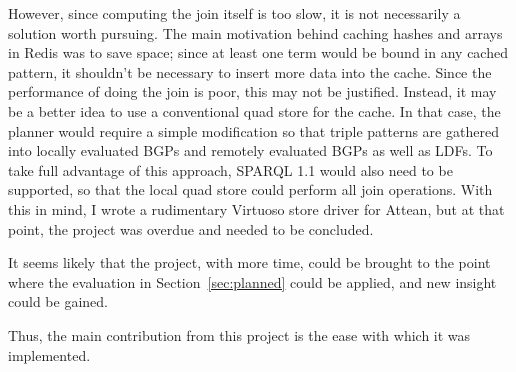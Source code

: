 However, since computing the join itself is too slow, it is not
necessarily a solution worth pursuing. The main motivation behind
caching hashes and arrays in Redis was to save space; since at least
one term would be bound in any cached pattern, it shouldn't be
necessary to insert more data into the cache. Since the performance of
doing the join is poor, this may not be justified. Instead, it may be
a better idea to use a conventional quad store for the cache. In that
case, the planner would require a simple modification so that triple
patterns are gathered into locally evaluated BGPs and remotely
evaluated BGPs as well as LDFs. To take full advantage of this
approach, SPARQL 1.1  would also need to be supported,
so that the local quad store could perform all join operations. With
this in mind, I wrote a rudimentary Virtuoso store driver for Attean, but
at that point, the project was overdue and needed to be concluded. 

It seems likely that the project, with more time, could be brought to
the point where the evaluation in Section~\ref{sec:planned} could be
applied, and new insight could be gained.

Thus, the main contribution from this project is the ease
with which it was implemented.

